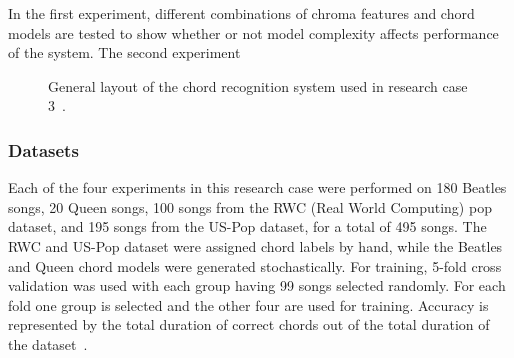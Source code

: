 \documentclass{sig-alternate}
\begin{document}
In the first experiment, different combinations of chroma features and chord models are tested to show whether or not model complexity affects performance of the system. The second experiment



\begin{figure}
\centering
{}
\caption{General layout of the chord recognition system used in research case 3~\cite{TaeMin:2014}.}
\label{fig:fig3}
\end{figure}

\subsubsection{Datasets}

Each of the four experiments in this research case were performed on 180 Beatles songs, 20 Queen songs, 100 songs from the RWC (Real World Computing) pop dataset, and 195 songs from the US-Pop dataset, for a total of 495 songs. The RWC and US-Pop dataset were assigned chord labels by hand, while the Beatles and Queen chord models were generated stochastically. For training, 5-fold cross validation was used with each group having 99 songs selected randomly. For each fold one group is selected and the other four are used for training. Accuracy is represented by the total duration of correct chords out of the total duration of the dataset~\cite{TaeMin:2014}.
\end{document}
